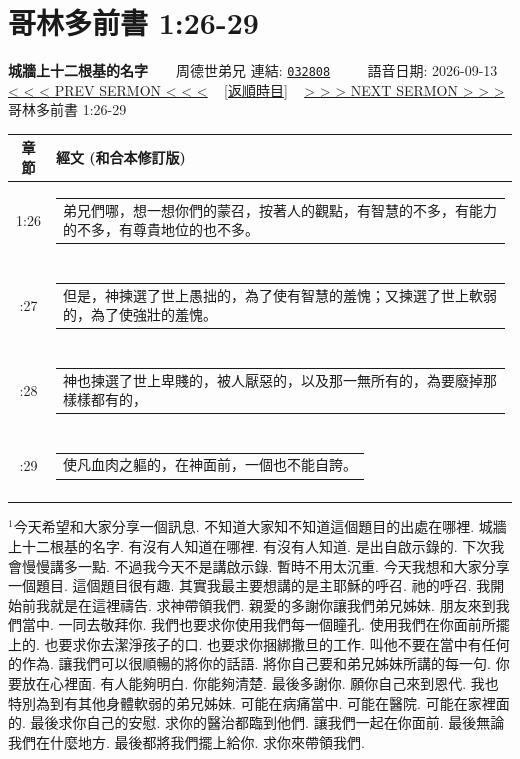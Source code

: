 \documentclass{book}
\begin{document}
\section{哥林多前書 1:26-29}
\label{sec:032808}
\textbf{城牆上十二根基的名字}~~~~周德世弟兄
\newline
\newline
連結: \href{http://www.church.com.hk/acms/content.asp?site=cdc\&op=show\&type=product\&code=032808\&layout=sermon}{\texttt{032808}} ~~~~ 語音日期: 2026-09-13
\newline
\newline
\hyperref[sec:032807]{\small{< < < PREV SERMON < < <}}
~
\hyperref[sec:index_chronic]{\small{[返順時目]}}
~
\hyperref[sec:032809]{\small{> > > NEXT SERMON > > >}}
\newline
\newline
哥林多前書 1:26-29
\newline
\begin{longtable}{cl}
\hline
\hline
章節 & 經文 (和合本修訂版)\\
\hline
1:26 & \begin{tabularx}{0.7\textwidth}{X} 弟兄們哪，想一想你們的蒙召，按著人的觀點，有智慧的不多，有能力的不多，有尊貴地位的也不多。 \end{tabularx} \\ \\ \relax
1:27 & \begin{tabularx}{0.7\textwidth}{X} 但是，神揀選了世上愚拙的，為了使有智慧的羞愧；又揀選了世上軟弱的，為了使強壯的羞愧。 \end{tabularx} \\ \\ \relax
1:28 & \begin{tabularx}{0.7\textwidth}{X} 神也揀選了世上卑賤的，被人厭惡的，以及那一無所有的，為要廢掉那樣樣都有的， \end{tabularx} \\ \\ \relax
1:29 & \begin{tabularx}{0.7\textwidth}{X} 使凡血肉之軀的，在神面前，一個也不能自誇。 \end{tabularx} \\ \\
[1ex]
\hline
\hline
\end{longtable}
$^{1}$今天希望和大家分享一個訊息.
不知道大家知不知道這個題目的出處在哪裡.
城牆上十二根基的名字.
有沒有人知道在哪裡.
有沒有人知道.
是出自啟示錄的.
下次我會慢慢講多一點.
不過我今天不是講啟示錄.
暫時不用太沉重.
今天我想和大家分享一個題目.
這個題目很有趣.
其實我最主要想講的是主耶穌的呼召.
祂的呼召.
我開始前我就是在這裡禱告.
求神帶領我們.
親愛的多謝你讓我們弟兄姊妹.
朋友來到我們當中.
一同去敬拜你.
我們也要求你使用我們每一個瞳孔.
使用我們在你面前所擺上的.
也要求你去潔淨孩子的口.
也要求你捆綁撒旦的工作.
叫他不要在當中有任何的作為.
讓我們可以很順暢的將你的話語.
將你自己要和弟兄姊妹所講的每一句.
你要放在心裡面.
有人能夠明白.
你能夠清楚.
最後多謝你.
願你自己來到恩代.
我也特別為到有其他身體軟弱的弟兄姊妹.
可能在病痛當中.
可能在醫院.
可能在家裡面的.
最後求你自己的安慰.
求你的醫治都臨到他們.
讓我們一起在你面前.
最後無論我們在什麼地方.
最後都將我們擺上給你.
求你來帶領我們.
\end{document}
